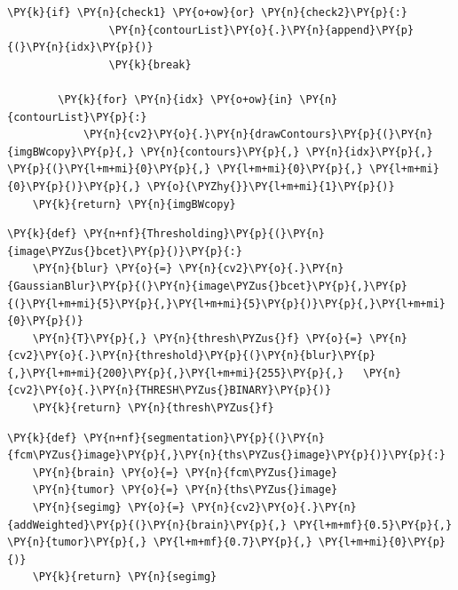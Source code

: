 \begin{tcolorbox}[breakable, size=fbox, boxrule=1pt, pad at break*=1mm,colback=cellbackground, colframe=cellborder]
\begin{Verbatim}[commandchars=\\\{\}]
            \PY{k}{if} \PY{n}{check1} \PY{o+ow}{or} \PY{n}{check2}\PY{p}{:}
                \PY{n}{contourList}\PY{o}{.}\PY{n}{append}\PY{p}{(}\PY{n}{idx}\PY{p}{)}
                \PY{k}{break}

        \PY{k}{for} \PY{n}{idx} \PY{o+ow}{in} \PY{n}{contourList}\PY{p}{:}
            \PY{n}{cv2}\PY{o}{.}\PY{n}{drawContours}\PY{p}{(}\PY{n}{imgBWcopy}\PY{p}{,} \PY{n}{contours}\PY{p}{,} \PY{n}{idx}\PY{p}{,} \PY{p}{(}\PY{l+m+mi}{0}\PY{p}{,} \PY{l+m+mi}{0}\PY{p}{,} \PY{l+m+mi}{0}\PY{p}{)}\PY{p}{,} \PY{o}{\PYZhy{}}\PY{l+m+mi}{1}\PY{p}{)}           
    \PY{k}{return} \PY{n}{imgBWcopy}
	\end{Verbatim}
\end{tcolorbox}

\begin{tcolorbox}[breakable, size=fbox, boxrule=1pt, pad at break*=1mm,colback=cellbackground, colframe=cellborder]
	\begin{Verbatim}[commandchars=\\\{\}]
\PY{k}{def} \PY{n+nf}{Thresholding}\PY{p}{(}\PY{n}{image\PYZus{}bcet}\PY{p}{)}\PY{p}{:}
    \PY{n}{blur} \PY{o}{=} \PY{n}{cv2}\PY{o}{.}\PY{n}{GaussianBlur}\PY{p}{(}\PY{n}{image\PYZus{}bcet}\PY{p}{,}\PY{p}{(}\PY{l+m+mi}{5}\PY{p}{,}\PY{l+m+mi}{5}\PY{p}{)}\PY{p}{,}\PY{l+m+mi}{0}\PY{p}{)}
    \PY{n}{T}\PY{p}{,} \PY{n}{thresh\PYZus{}f} \PY{o}{=} \PY{n}{cv2}\PY{o}{.}\PY{n}{threshold}\PY{p}{(}\PY{n}{blur}\PY{p}{,}\PY{l+m+mi}{200}\PY{p}{,}\PY{l+m+mi}{255}\PY{p}{,}   \PY{n}{cv2}\PY{o}{.}\PY{n}{THRESH\PYZus{}BINARY}\PY{p}{)}
    \PY{k}{return} \PY{n}{thresh\PYZus{}f}
	\end{Verbatim}
\end{tcolorbox}

\begin{tcolorbox}[breakable, size=fbox, boxrule=1pt, pad at break*=1mm,colback=cellbackground, colframe=cellborder]
	\begin{Verbatim}[commandchars=\\\{\}]
\PY{k}{def} \PY{n+nf}{segmentation}\PY{p}{(}\PY{n}{fcm\PYZus{}image}\PY{p}{,}\PY{n}{ths\PYZus{}image}\PY{p}{)}\PY{p}{:}
    \PY{n}{brain} \PY{o}{=} \PY{n}{fcm\PYZus{}image}
    \PY{n}{tumor} \PY{o}{=} \PY{n}{ths\PYZus{}image}
    \PY{n}{segimg} \PY{o}{=} \PY{n}{cv2}\PY{o}{.}\PY{n}{addWeighted}\PY{p}{(}\PY{n}{brain}\PY{p}{,} \PY{l+m+mf}{0.5}\PY{p}{,} \PY{n}{tumor}\PY{p}{,} \PY{l+m+mf}{0.7}\PY{p}{,} \PY{l+m+mi}{0}\PY{p}{)}
    \PY{k}{return} \PY{n}{segimg}
	\end{Verbatim}
\end{tcolorbox}

